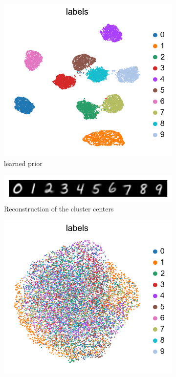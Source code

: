 \documentclass[11pt, a4paper]{report}
\theoremstyle{plain}
\theoremstyle{definition}
\theoremstyle{remark}
\begin{document}
\begin{figure}[h]
\centering
\begin{subfigure}[b]{0.33\textwidth}
\includegraphics[width=\textwidth]{images/cvae2lp.umap.mnist.png}
\caption{learned prior}
\end{subfigure}
\begin{subfigure}[t]{0.33\textwidth}
\includegraphics[width=\textwidth]{images/cvae2lp.clusterheads.mnist.png}
\caption{Reconstruction of the cluster centers}
\end{subfigure}
\begin{subfigure}[b]{0.33\textwidth}
\includegraphics[width=\textwidth]{images/cvae1nolp.umap.mnist.png}

\end{subfigure}
\end{figure}
\end{document}
